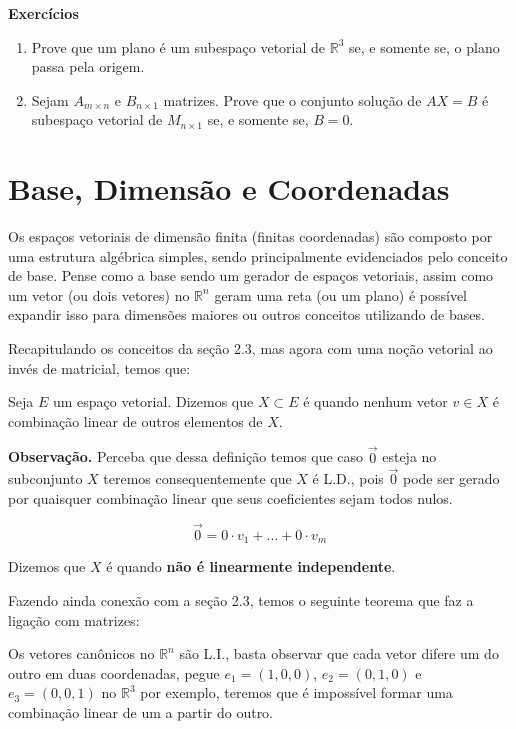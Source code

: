 \documentclass[../main.tex]{subfiles}
\begin{document}
		{\Large\textbf{Exercícios}}
		\begin{enumerate}
				\item Prove que um plano é um subespaço vetorial de $\mathbb{R}^3$ se, e somente se, o plano passa pela origem.
				\item Sejam $A_{m\times n}$ e $B_{n \times 1}$ matrizes. Prove que o conjunto solução de $AX = B$ é subespaço vetorial de $M_{n\times 1}$ se, e somente se, $B = 0$.
		\end{enumerate}
	
	\section{Base, Dimensão e Coordenadas}
	
	
	Os espaços vetoriais de dimensão finita (finitas coordenadas) são composto por uma estrutura algébrica simples, sendo principalmente evidenciados pelo conceito de base. Pense como a base sendo um gerador de espaços vetoriais, assim como um vetor (ou dois vetores) no $\mathbb{R}^n$ geram uma reta (ou um plano) é possível expandir isso para dimensões maiores ou outros conceitos utilizando de bases.
	
	Recapitulando os conceitos da seção 2.3, mas agora com uma noção vetorial ao invés de matricial, temos que:
	\begin{definicao}
		Seja $E$ um espaço vetorial. Dizemos que $X \subset E$ é  quando nenhum vetor $v \in X$ é combinação linear de outros elementos de $X$. 
	\end{definicao}
	
	\textbf{Observação.} Perceba que dessa definição temos que caso $\vec{0}$ esteja no subconjunto $X$ teremos consequentemente que $X$ é L.D., pois $\vec{0}$ pode ser gerado por quaisquer combinação linear que seus coeficientes sejam todos nulos.
	
	$$\vec{0}=0\cdot v_1 + ... + 0\cdot v_m $$
	
	\begin{definicao}
		Dizemos que $X$ é  quando \textbf{não é linearmente independente}.
	\end{definicao}
	
	Fazendo ainda conexão com a seção 2.3, temos o seguinte teorema que faz a ligação com matrizes:
	
	\begin{exemplo}Os vetores canônicos no $\mathbb{R}^n$ são L.I., basta observar que cada vetor difere um do outro em duas coordenadas, pegue $e_1 = (1,0,0)$, $e_2 = (0,1,0)$ e $e_3 = (0,0,1)$ no $\mathbb{R}^3$ por exemplo, teremos que é impossível formar uma combinação linear de um a partir do outro.
	\end{exemplo}
	
\end{document}
